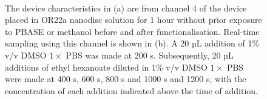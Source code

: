 \documentclass[
  a4paper,
]{scrbook}
\begin{document}
\begin{figure}
\begin{minipage}[t]{0.03\linewidth}
{\centering 

~

}

\end{minipage}%
%
\begin{minipage}[t]{0.03\linewidth}

{\centering 


}

\end{minipage}%
%
\begin{minipage}[t]{0.45\linewidth}

{\centering 


}

\end{minipage}%

\caption{\label{fig-OR22a-variability-TX-comparison}The device
characteristics in (a) are from channel 4 of the device placed in OR22a
nanodisc solution for 1 hour without prior exposure to PBASE or methanol
before and after functionalisation. Real-time sampling using this
channel is shown in (b). A 20 µL addition of 1\% v/v DMSO \(1 \times\)
PBS was made at 200 s. Subsequently, 20 µL additions of ethyl hexanoate
diluted in 1\% v/v DMSO \(1 \times\) PBS were made at 400 s, 600 s, 800
s and 1000 s and 1200 s, with the concentration of each addition
indicated above the time of addition.}

\end{figure}
\end{document}
